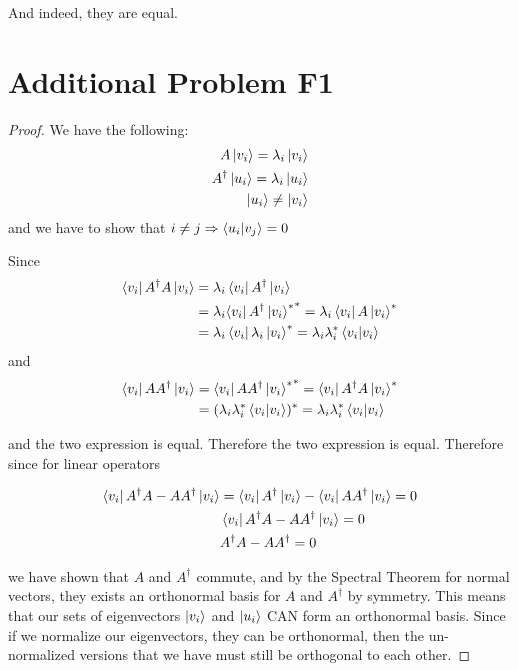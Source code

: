 \documentclass{article}
\begin{document}
And indeed, they are equal.

\section{Additional Problem F1}

\begin{proof}
    We have the following:
    \begin{align}
        A \ket{v_i} = \lambda_i \ket{v_i} \\
        A^\dagger \ket{u_i} = \lambda_i \ket{u_i} \\
        \ket{u_i} \neq \ket{v_i}
    \end{align}
    and we have to show that $i\neq j \Rightarrow \bra{u_i}\ket{v_j} = 0$

    Since \begin{align}
        \bra{v_i} A^\dagger A \ket{v_i} &= \lambda_i \bra{v_i} A^\dagger \ket{v_i} \\ &= \lambda_i {\bra{v_i} A^\dagger \ket{v_i}^*}^* = \lambda_i \bra{v_i} A \ket{v_i}^* \\ &= \lambda_i \bra{v_i} \lambda_i \ket{v_i}^* = \lambda_i \lambda^*_i \bra{v_i} \ket{v_i}
    \end{align}
    and \begin{align}
        \bra{v_i} A A^\dagger \ket{v_i} &= {\bra{v_i} A A^\dagger \ket{v_i}^*}^* = \bra{v_i} A^\dagger A \ket{v_i}^* \\ &= (\lambda_i \lambda^*_i \bra{v_i} \ket{v_i})^* = \lambda_i \lambda^*_i \bra{v_i} \ket{v_i}
    \end{align}

    and the two expression is equal. Therefore the two expression is equal. Therefore since for linear operators

    \begin{align}
        \bra{v_i}A^\dagger A - AA^\dagger \ket{v_i} &= \bra{v_i} A^\dagger \ket{v_i} - \bra{v_i} AA^\dagger \ket{v_i} = 0 \\
        &\bra{v_i} A^\dagger A - AA^\dagger \ket{v_i} = 0 \\
        &A^\dagger A - AA^\dagger = 0
    \end{align}

    we have shown that $A$ and $A^\dagger$ commute, and by the Spectral Theorem for normal vectors, they exists an orthonormal basis for $A$ and $A^\dagger$ by symmetry. This means that our sets of eigenvectors $\ket{v_i}$ and $\ket{u_i}$ CAN form an orthonormal basis. Since if we normalize our eigenvectors, they can be orthonormal, then the un-normalized versions that we have must still be orthogonal to each other.


\end{proof}
\end{document}

